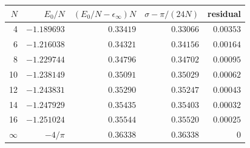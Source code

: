\begin{tabular}{rrrrr}
\toprule
$N$ & $E_0/N$ & $(E_0/N - \epsilon_\infty) N$ & $\sigma - \pi/(24N)$ & residual \\
\midrule
4 & $-1.189693$ & $0.33419$ & $0.33066$ & $0.00353$ \\
6 & $-1.216038$ & $0.34321$ & $0.34156$ & $0.00164$ \\
8 & $-1.229744$ & $0.34796$ & $0.34702$ & $0.00095$ \\
10 & $-1.238149$ & $0.35091$ & $0.35029$ & $0.00062$ \\
12 & $-1.243831$ & $0.35290$ & $0.35247$ & $0.00043$ \\
14 & $-1.247929$ & $0.35435$ & $0.35403$ & $0.00032$ \\
16 & $-1.251024$ & $0.35544$ & $0.35520$ & $0.00025$ \\
$\infty$ & $-4/\pi$ & $0.36338$ & $0.36338$ & $0$ \\
\bottomrule
\end{tabular}
